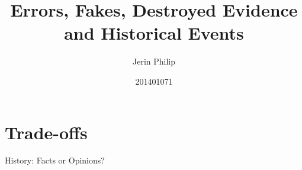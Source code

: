 \documentclass[a4paper]{article}
\title{Errors, Fakes, Destroyed Evidence and Historical Events}
\author{Jerin Philip}
\date{201401071}
\begin{document}
\maketitle


\section{Trade-offs}
History: Facts or Opinions? 



\printbibliography 
\end{document}
